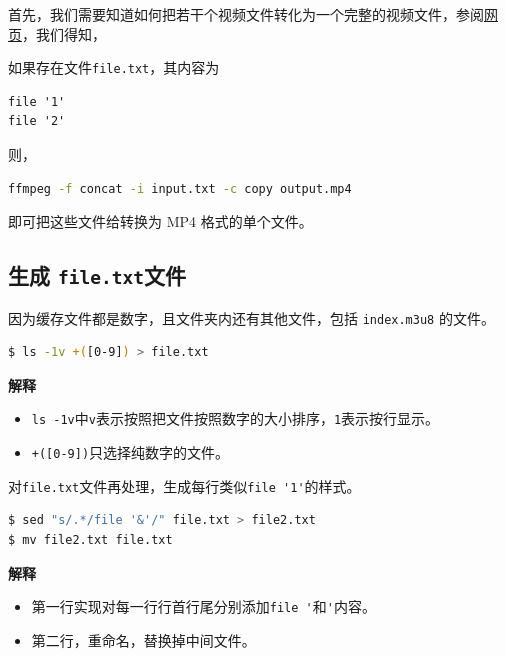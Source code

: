 \documentclass[doctor,openright,twoside]{sjtuthesis}
\providecommand{\tightlist}{%
    \setlength{\itemsep}{0pt}\setlength{\parskip}{0pt}}
\newcommand{\passthrough}[1]{#1}
\theoremstyle{plain}
\theoremstyle{definition}
\theoremstyle{remark}
\theoremstyle{ocrenumbox}
\theoremstyle{plain}
\begin{document}
首先，我们需要知道如何把若干个视频文件转化为一个完整的视频文件，参阅\href{https://stackoverflow.com/questions/14829819/how-to-concatenate-flv-file-into-one}{网页}，我们得知，

如果存在文件\passthrough{\lstinline!file.txt!}，其内容为

\begin{lstlisting}
file '1'
file '2'
\end{lstlisting}

则，

\begin{lstlisting}[language=bash]
ffmpeg -f concat -i input.txt -c copy output.mp4
\end{lstlisting}

即可把这些文件给转换为 MP4 格式的单个文件。

\hypertarget{-file.txt}{%
\subsection{\texorpdfstring{生成
\texttt{file.txt}文件}{生成 file.txt文件}}\label{-file.txt}}

因为缓存文件都是数字，且文件夹内还有其他文件，包括
\passthrough{\lstinline!index.m3u8!} 的文件。

\begin{lstlisting}[language=bash]
$ ls -1v +([0-9]) > file.txt
\end{lstlisting}

\textbf{解释}

\begin{itemize}
\tightlist
\item
  \passthrough{\lstinline!ls -1v!}中\passthrough{\lstinline!v!}表示按照把文件按照数字的大小排序，\passthrough{\lstinline!1!}表示按行显示。
\item
  \passthrough{\lstinline!+([0-9])!}只选择纯数字的文件。
\end{itemize}

对\passthrough{\lstinline!file.txt!}文件再处理，生成每行类似\passthrough{\lstinline!file '1'!}的样式。

\begin{lstlisting}[language=bash]
$ sed "s/.*/file '&'/" file.txt > file2.txt
$ mv file2.txt file.txt
\end{lstlisting}

\textbf{解释}

\begin{itemize}
\tightlist
\item
  第一行实现对每一行行首行尾分别添加\passthrough{\lstinline!file '!}和\passthrough{\lstinline!'!}内容。
\item
  第二行，重命名，替换掉中间文件。
\end{itemize}
\end{document}
